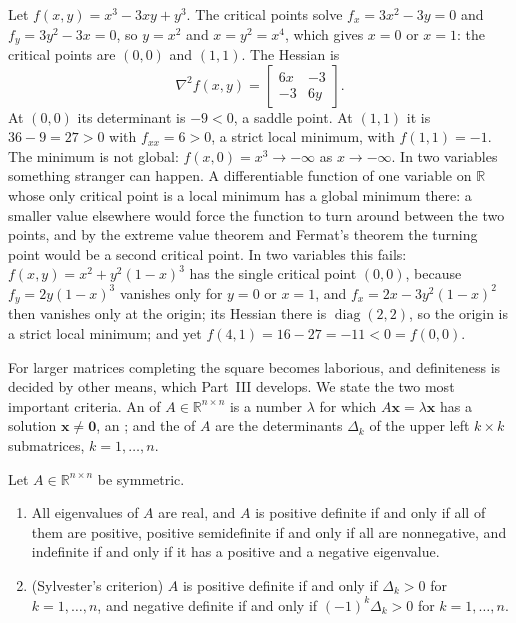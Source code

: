 Let $f(x,y)=x^3-3xy+y^3$. The critical points solve $f_x=3x^2-3y=0$ and $f_y=3y^2-3x=0$, so $y=x^2$ and $x=y^2=x^4$, which gives $x=0$ or $x=1$: the critical points are $(0,0)$ and $(1,1)$. The Hessian is
\[
\nabla^2f(x,y)=\begin{bmatrix}6x&-3\\-3&6y\end{bmatrix}.
\]
At $(0,0)$ its determinant is $-9<0$, a saddle point. At $(1,1)$ it is $36-9=27>0$ with $f_{xx}=6>0$, a strict local minimum, with $f(1,1)=-1$. The minimum is not global: $f(x,0)=x^3\to-\infty$ as $x\to-\infty$. In two variables something stranger can happen. A differentiable function of one variable on $\mathbb R$ whose only critical point is a local minimum has a global minimum there: a smaller value elsewhere would force the function to turn around between the two points, and by the extreme value theorem and Fermat's theorem the turning point would be a second critical point. In two variables this fails: $f(x,y)=x^2+y^2(1-x)^3$ has the single critical point $(0,0)$, because $f_y=2y(1-x)^3$ vanishes only for $y=0$ or $x=1$, and $f_x=2x-3y^2(1-x)^2$ then vanishes only at the origin; its Hessian there is $\operatorname{diag}(2,2)$, so the origin is a strict local minimum; and yet $f(4,1)=16-27=-11<0=f(0,0)$.

For larger matrices completing the square becomes laborious, and definiteness is decided by other means, which Part~III develops. We state the two most important criteria. An  of $A\in\mathbb R^{n\times n}$ is a number $\lambda$ for which $A\mathbf x=\lambda\mathbf x$ has a solution $\mathbf x\ne\mathbf0$, an ; and the  of $A$ are the determinants $\Delta_k$ of the upper left $k\times k$ submatrices, $k=1,\ldots,n$.

\begin{theorem}
\label{thm:definiteness-criteria}
Let $A\in\mathbb R^{n\times n}$ be symmetric.
\begin{enumerate}
\item All eigenvalues of $A$ are real, and $A$ is positive definite if and only if all of them are positive, positive semidefinite if and only if all are nonnegative, and indefinite if and only if it has a positive and a negative eigenvalue.
\item (Sylvester's criterion) $A$ is positive definite if and only if $\Delta_k>0$ for $k=1,\ldots,n$, and negative definite if and only if $(-1)^k\Delta_k>0$ for $k=1,\ldots,n$.
\end{enumerate}
\end{theorem}

